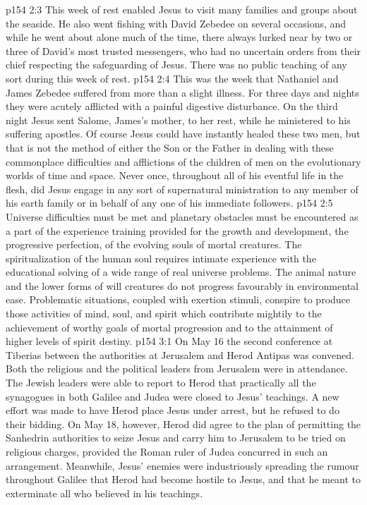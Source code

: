 \vs p154 2:3 This week of rest enabled Jesus to visit many families and groups about the seaside. He also went fishing with David Zebedee on several occasions, and while he went about alone much of the time, there always lurked near by two or three of David’s most trusted messengers, who had no uncertain orders from their chief respecting the safeguarding of Jesus. There was no public teaching of any sort during this week of rest.
\vs p154 2:4 \pc This was the week that Nathaniel and James Zebedee suffered from more than a slight illness. For three days and nights they were acutely afflicted with a painful digestive disturbance. On the third night Jesus sent Salome, James’s mother, to her rest, while he ministered to his suffering apostles. Of course Jesus could have instantly healed these two men, but that is not the method of either the Son or the Father in dealing with these commonplace difficulties and afflictions of the children of men on the evolutionary worlds of time and space. Never once, throughout all of his eventful life in the flesh, did Jesus engage in any sort of supernatural ministration to any member of his earth family or in behalf of any one of his immediate followers.
\vs p154 2:5 Universe difficulties must be met and planetary obstacles must be encountered as a part of the experience training provided for the growth and development, the progressive perfection, of the evolving souls of mortal creatures. The spiritualization of the human soul requires intimate experience with the educational solving of a wide range of real universe problems. The animal nature and the lower forms of will creatures do not progress favourably in environmental ease. Problematic situations, coupled with exertion stimuli, conspire to produce those activities of mind, soul, and spirit which contribute mightily to the achievement of worthy goals of mortal progression and to the attainment of higher levels of spirit destiny.
\vs p154 3:1 On May 16 the second conference at Tiberias between the authorities at Jerusalem and Herod Antipas was convened. Both the religious and the political leaders from Jerusalem were in attendance. The Jewish leaders were able to report to Herod that practically all the synagogues in both Galilee and Judea were closed to Jesus’ teachings. A new effort was made to have Herod place Jesus under arrest, but he refused to do their bidding. On May 18, however, Herod did agree to the plan of permitting the Sanhedrin authorities to seize Jesus and carry him to Jerusalem to be tried on religious charges, provided the Roman ruler of Judea concurred in such an arrangement. Meanwhile, Jesus’ enemies were industriously spreading the rumour throughout Galilee that Herod had become hostile to Jesus, and that he meant to exterminate all who believed in his teachings.
